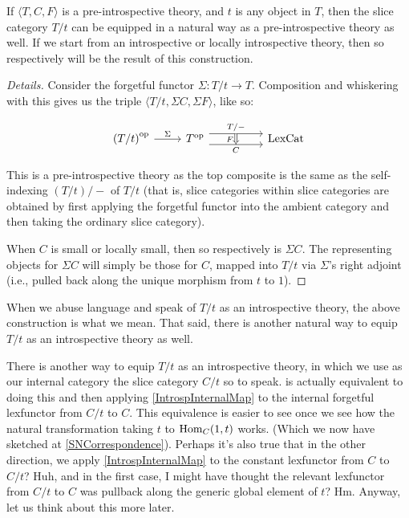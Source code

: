 \begin{construction}\label{IntrospSlice}
If $\langle T, C, F \rangle$ is a pre-introspective theory, and $t$ is any object in $T$, then the slice category $T/t$ can be equipped in a natural way as a pre-introspective theory as well. If we start from an introspective or locally introspective theory, then so respectively will be the result of this construction.
\end{construction}
\begin{proof}[Details]
Consider the forgetful functor $\Sigma : T/t \to T$. Composition and whiskering with this gives us the triple $\langle T/t, \Sigma C, \Sigma F \rangle$, like so:

\[\begin{tikzcd}
	{\op{\left(T/t\right)}} & {\op{T}} && {\LexCat}
	\arrow["{T/-}"{name=0}, from=1-2, to=1-4, shift left=2]
	\arrow["{C}"{name=1, swap}, from=1-2, to=1-4, shift right=2]
	\arrow["{\Sigma}", from=1-1, to=1-2]
	\arrow[Rightarrow, "{F}"', from=0, to=1]
\end{tikzcd}\]

This is a pre-introspective theory as the top composite is the same as the self-indexing $(T/t)/-$ of $T/t$ (that is, slice categories within slice categories are obtained by first applying the forgetful functor into the ambient category and then taking the ordinary slice category).

When $C$ is small or locally small, then so respectively is $\Sigma C$. The representing objects for $\Sigma C$ will simply be those for $C$, mapped into $T/t$ via $\Sigma$'s right adjoint (i.e., pulled back along the unique morphism from $t$ to $1$).
\end{proof}

When we abuse language and speak of $T/t$ as an introspective theory, the above construction is what we mean. That said, there is another natural way to equip $T/t$ as an introspective theory as well.

\begin{TODOblock}
There is another way to equip $T/t$ as an introspective theory, in which we use as our internal category the slice category $C/t$ so to speak.  is actually equivalent to doing this and then applying \cref{IntrospInternalMap} to the internal forgetful lexfunctor from $C/t$ to $C$. This equivalence is easier to see once we see how the natural transformation taking $t$ to $\operatorname{Hom}_C(1, t)$ works. (Which we now have sketched at \cref{SNCorrespondence}). Perhaps it's also true that in the other direction, we apply \cref{IntrospInternalMap} to the constant lexfunctor from $C$ to $C/t$? Huh, and in the first case, I might have thought the relevant lexfunctor from $C/t$ to $C$ was pullback along the generic global element of $t$? Hm. Anyway, let us think about this more later.
\end{TODOblock}